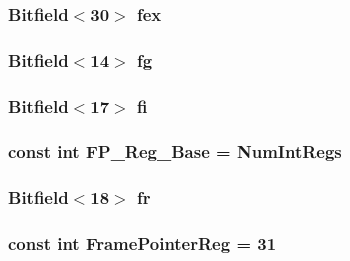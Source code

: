 \label{namespacePowerISA_ac246f57732ad71b0d35db5adfe68e70d}
\hypertarget{namespacePowerISA_a84ae18295720ae3dbeeea2356b67257d}{
\subsubsection[{fex}]{\setlength{\rightskip}{0pt plus 5cm}Bitfield$<$30$>$ {\bf fex}}}
\label{namespacePowerISA_a84ae18295720ae3dbeeea2356b67257d}
\hypertarget{namespacePowerISA_a4df80832d2905b80a0f14fc0257e6cf9}{
\subsubsection[{fg}]{\setlength{\rightskip}{0pt plus 5cm}Bitfield$<$14$>$ {\bf fg}}}
\label{namespacePowerISA_a4df80832d2905b80a0f14fc0257e6cf9}
\hypertarget{namespacePowerISA_ad1ab6d62c8f46570392bf3884625e17e}{
\subsubsection[{fi}]{\setlength{\rightskip}{0pt plus 5cm}Bitfield$<$17$>$ {\bf fi}}}
\label{namespacePowerISA_ad1ab6d62c8f46570392bf3884625e17e}
\hypertarget{namespacePowerISA_a833d6deee31e8a9398618efdc22effde}{
\subsubsection[{FP\_\-Reg\_\-Base}]{\setlength{\rightskip}{0pt plus 5cm}const int {\bf FP\_\-Reg\_\-Base} = {\bf NumIntRegs}}}
\label{namespacePowerISA_a833d6deee31e8a9398618efdc22effde}
\hypertarget{namespacePowerISA_a17876013db28062a38acd45cf40eac37}{
\subsubsection[{fr}]{\setlength{\rightskip}{0pt plus 5cm}Bitfield$<$18$>$ {\bf fr}}}
\label{namespacePowerISA_a17876013db28062a38acd45cf40eac37}
\hypertarget{namespacePowerISA_aabd6fa5889c9ccc124dfd4a984046f6f}{
\subsubsection[{FramePointerReg}]{\setlength{\rightskip}{0pt plus 5cm}const int {\bf FramePointerReg} = 31}}

